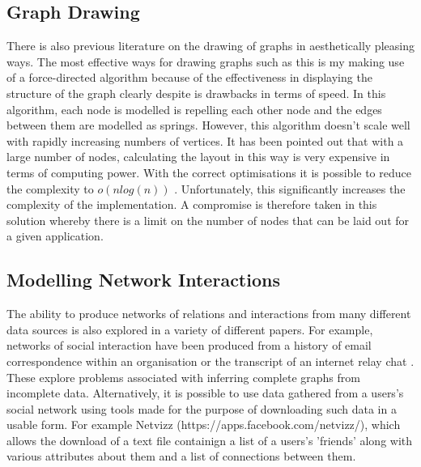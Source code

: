 \documentclass[12pt,a4paper]{article}
\begin{document}
\subsection{Graph Drawing}
\noindent
There is also previous literature on the drawing of graphs in aesthetically pleasing ways. The most effective ways for drawing graphs such as this is my making use of a force-directed algorithm \cite{himsolt1995comparing} because of the effectiveness in displaying the structure of the graph clearly despite is drawbacks in terms of speed. In this algorithm, each node is modelled is repelling each other node and the edges between them are modelled as springs\cite{fruchterman1991graph}. However, this algorithm doesn't scale well with rapidly increasing numbers of vertices. It has been pointed out that with a large number of nodes, calculating the layout in this way is very expensive in terms of computing power. With the correct optimisations it is possible to reduce the complexity to $o(nlog(n))$ \cite{barnes1986hierarchical}. Unfortunately, this significantly increases the complexity of the implementation. A compromise is therefore taken in this solution whereby there is a limit on the number of nodes that can be laid out for a given application.

\subsection{Modelling Network Interactions}
\noindent
The ability to produce networks of relations and interactions from many different data sources is also explored in a variety of different papers. For example, networks of social interaction have been produced from a history of email correspondence within an organisation \cite{fisher2004social} or the transcript of an internet relay chat \cite{mutton2004inferring}. These explore problems associated with inferring complete graphs from incomplete data. Alternatively, it is possible to use data gathered from a users's social network using tools made for the purpose of downloading such data in a usable form. For example Netvizz (https://apps.facebook.com/netvizz/), which allows the download of a text file containign a list of a users's 'friends' along with various attributes about them and a list of connections between them.
\end{document}
